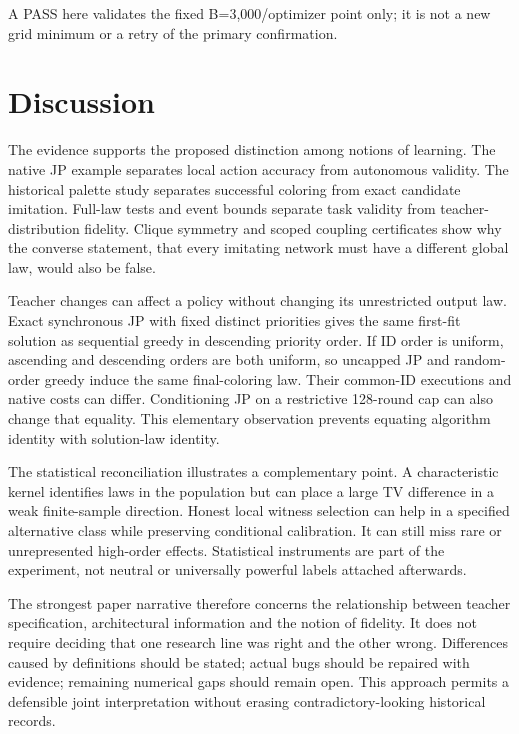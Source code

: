 \documentclass[
  11pt,
]{article}
\begin{document}
A PASS here validates the fixed B=3,000/optimizer point only; it is not
a new grid minimum or a retry of the primary confirmation.

\section{Discussion}\label{discussion}

The evidence supports the proposed distinction among notions of
learning. The native JP example separates local action accuracy from
autonomous validity. The historical palette study separates successful
coloring from exact candidate imitation. Full-law tests and event bounds
separate task validity from teacher-distribution fidelity. Clique
symmetry and scoped coupling certificates show why the converse
statement, that every imitating network must have a different global
law, would also be false.

Teacher changes can affect a policy without changing its unrestricted
output law. Exact synchronous JP with fixed distinct priorities gives
the same first-fit solution as sequential greedy in descending priority
order. If ID order is uniform, ascending and descending orders are both
uniform, so uncapped JP and random-order greedy induce the same
final-coloring law. Their common-ID executions and native costs can
differ. Conditioning JP on a restrictive 128-round cap can also change
that equality. This elementary observation prevents equating algorithm
identity with solution-law identity.

The statistical reconciliation illustrates a complementary point. A
characteristic kernel identifies laws in the population but can place a
large TV difference in a weak finite-sample direction. Honest local
witness selection can help in a specified alternative class while
preserving conditional calibration. It can still miss rare or
unrepresented high-order effects. Statistical instruments are part of
the experiment, not neutral or universally powerful labels attached
afterwards.

The strongest paper narrative therefore concerns the relationship
between teacher specification, architectural information and the notion
of fidelity. It does not require deciding that one research line was
right and the other wrong. Differences caused by definitions should be
stated; actual bugs should be repaired with evidence; remaining
numerical gaps should remain open. This approach permits a defensible
joint interpretation without erasing contradictory-looking historical
records.
\end{document}
